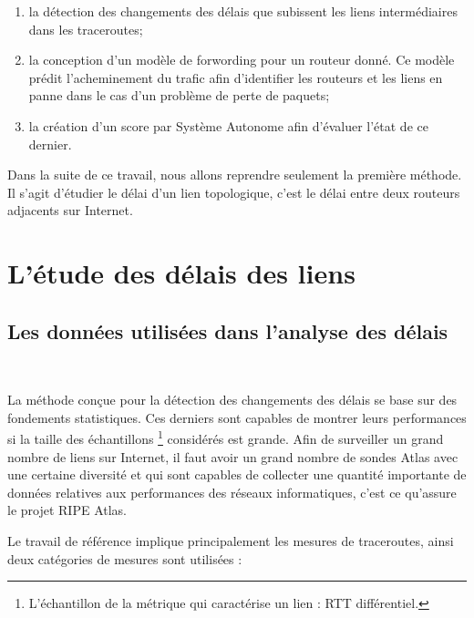\begin{enumerate}
	\item la détection des changements des délais que subissent les liens intermédiaires dans les traceroutes; 
	
	\item la conception d'un modèle de forwording pour un routeur donné. Ce modèle  prédit l'acheminement du trafic afin d'identifier les routeurs  et les liens en panne dans le cas  d'un problème  de perte de paquets;
	
	\item la création d'un score par Système Autonome afin d'évaluer l'état de ce dernier.
	
\end{enumerate}

Dans la suite de ce travail, nous allons reprendre seulement la première méthode.  Il s'agit d'étudier le délai d'un lien topologique, c'est le délai entre deux routeurs adjacents sur Internet.


\section{L'étude des délais des liens }

\subsection{Les données utilisées dans l'analyse des délais}~

La méthode conçue pour la détection des changements des délais se base sur des fondements statistiques. Ces derniers sont capables de montrer leurs performances si la taille des échantillons \footnote{L'échantillon de la métrique qui caractérise un lien : RTT différentiel.} considérés est grande.   Afin de surveiller un grand nombre de liens sur Internet, il faut avoir un grand nombre de sondes Atlas avec une certaine diversité et  qui sont capables de collecter une quantité importante de données relatives aux performances des réseaux informatiques, c'est ce qu'assure le projet RIPE Atlas.

Le travail de référence implique principalement les mesures de traceroutes, ainsi deux catégories de mesures sont utilisées :

